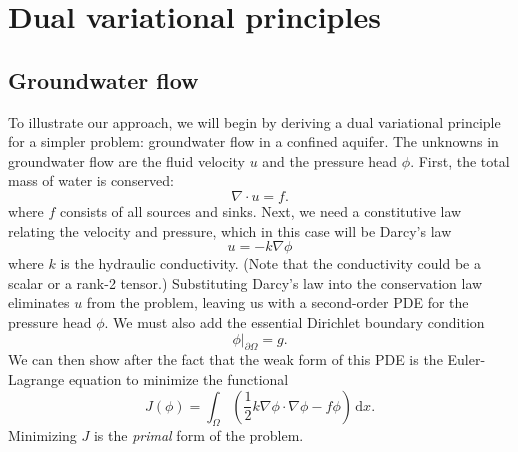 \documentclass{article}
\theoremstyle{definition}
\theoremstyle{plain}
\newcommand{\ud}{\hspace{2pt}\mathrm{d}}
\begin{document}
\section{Dual variational principles}

\subsection{Groundwater flow}

To illustrate our approach, we will begin by deriving a dual variational principle for a simpler problem: groundwater flow in a confined aquifer.
The unknowns in groundwater flow are the fluid velocity $u$ and the pressure head $\phi$.
First, the total mass of water is conserved:
\begin{equation}
    \nabla\cdot u = f.
    \label{eq:groundwater-conservation-law}
\end{equation}
where $f$ consists of all sources and sinks.
Next, we need a constitutive law relating the velocity and pressure, which in this case will be Darcy's law
\begin{equation}
    u = -k\nabla\phi
    \label{eq:darcy-law}
\end{equation}
where $k$ is the hydraulic conductivity.
(Note that the conductivity could be a scalar or a rank-2 tensor.)
Substituting Darcy's law into the conservation law eliminates $u$ from the problem, leaving us with a second-order PDE for the pressure head $\phi$.
We must also add the essential Dirichlet boundary condition
\begin{equation}
    \phi|_{\partial\Omega} = g.
    \label{eq:dirichlet-bc}
\end{equation}
We can then show after the fact that the weak form of this PDE is the Euler-Lagrange equation to minimize the functional
\begin{equation}
    J(\phi) = \int_\Omega\left(\frac{1}{2}k\nabla\phi\cdot\nabla\phi - f\phi\right)\ud x.
\end{equation}
Minimizing $J$ is the \emph{primal} form of the problem.
\end{document}
